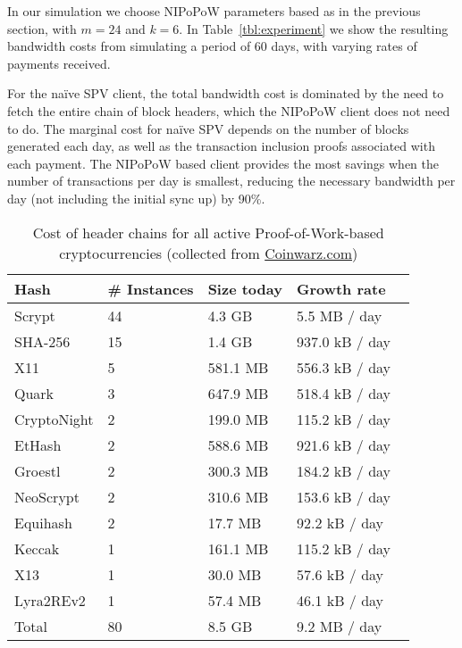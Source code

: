  In our simulation we choose NIPoPoW parameters based as in the previous section, with $m=24$ and $k=6$.
In Table~\ref{tbl:experiment} we show the resulting bandwidth costs from simulating a period of 60 days, with varying rates of payments received.

 For the na\"ive SPV client, the total bandwidth cost is dominated by the need to fetch the entire chain of block headers, which the NIPoPoW client does not need to do. The marginal cost for na\"ive SPV depends on the number of blocks generated each day, as well as the transaction inclusion proofs associated with each payment. The NIPoPoW based client provides the most savings when the number of transactions per day is smallest, reducing the necessary bandwidth per day (not including the initial sync up) by 90\%.

\begin{table}
  \caption{Cost of header chains for all active Proof-of-Work-based cryptocurrencies (collected from \url{Coinwarz.com})}
  \label{tbl:currencies}
\small
  \begin{tabular}{l|l|l|l}
    {\bf Hash} & {\bf \# Instances} & {\bf Size today} & {\bf Growth rate}  \\
    \hline
    Scrypt  & 44  & 4.3 GB  & 5.5 MB / day \  \\
    SHA-256  & 15  & 1.4 GB  & 937.0 kB / day \  \\
    X11  & 5  & 581.1 MB  & 556.3 kB / day \  \\
    Quark  & 3  & 647.9 MB  & 518.4 kB / day \  \\
    CryptoNight  & 2  & 199.0 MB  & 115.2 kB / day \  \\
    EtHash  & 2  & 588.6 MB  & 921.6 kB / day \  \\
    Groestl  & 2  & 300.3 MB  & 184.2 kB / day \  \\
    NeoScrypt  & 2  & 310.6 MB  & 153.6 kB / day \  \\
    Equihash  & 2  & 17.7 MB  & 92.2 kB / day \  \\
    Keccak  & 1  & 161.1 MB  & 115.2 kB / day \  \\
    X13  & 1  & 30.0 MB  & 57.6 kB / day \  \\
    Lyra2REv2  & 1  & 57.4 MB  & 46.1 kB / day \  \\
    \hline
    Total  & 80   &  8.5 GB  & 9.2 MB  / day  \\
  \end{tabular}
\end{table}



